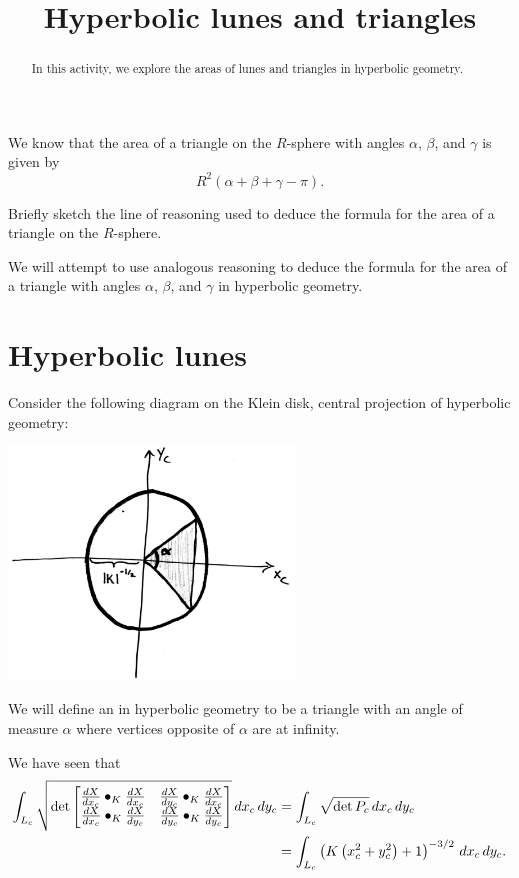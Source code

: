 \documentclass{ximera}
\title{Hyperbolic lunes and triangles}
\begin{document}
\begin{abstract}
In this activity, we explore the areas of lunes and triangles in
hyperbolic geometry.
\end{abstract}
\maketitle

We know that the area of a triangle on the $R$-sphere with angles
$\alpha$, $\beta$, and $\gamma$ is given by
\[
R^2(\alpha+\beta+\gamma - \pi).
\]
\begin{problem}
  Briefly sketch the line of reasoning used to deduce the formula for
  the area of a triangle on the $R$-sphere.
\end{problem}

We will attempt to use analogous reasoning to deduce the formula for
the area of a triangle with angles $\alpha$, $\beta$, and $\gamma$ in
hyperbolic geometry.

\section{Hyperbolic lunes}

Consider the following diagram on the Klein disk, central projection
of hyperbolic geometry:
\begin{image}
  \includegraphics[width=3in]{diagramOfHyperbolicLune.png}
\end{image}

\begin{definition}
  We will define an  in hyperbolic
  geometry to be a triangle with an angle of measure $\alpha$ where
  vertices opposite of $\alpha$ are at infinity.
\end{definition}

We have seen that
\begin{align*}
  \int_{L_c} \sqrt{
  \det
  \begin{bmatrix}
    \dd[X]{x_c}\bullet_K \dd[X]{x_c} & \dd[X]{y_c}\bullet_K \dd[X]{x_c} \\
    \dd[X]{x_c}\bullet_K \dd[X]{y_c} & \dd[X]{y_c}\bullet_K \dd[X]{y_c}
  \end{bmatrix}
  }\d x_c\d y_c &=
  \int_{L_c} \sqrt{\det P_c}\d x_c\d y_c\\
  &=\int_{L_c} \left(K\left(x_c^2+y_c^2\right)+1\right)^{-3/2} \d x_c\d y_c.
\end{align*}
\end{document}
